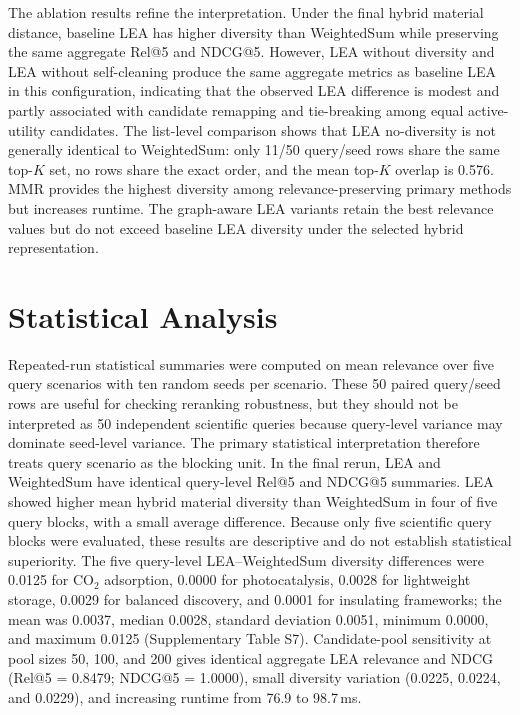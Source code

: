 \documentclass[12pt,a4paper]{article}
\begin{document}
The ablation results refine the interpretation. Under the final hybrid material distance, baseline LEA has higher diversity than WeightedSum while preserving the same aggregate Rel@5 and NDCG@5. However, LEA without diversity and LEA without self-cleaning produce the same aggregate metrics as baseline LEA in this configuration, indicating that the observed LEA difference is modest and partly associated with candidate remapping and tie-breaking among equal active-utility candidates. The list-level comparison shows that LEA no-diversity is not generally identical to WeightedSum: only 11/50 query/seed rows share the same top-$K$ set, no rows share the exact order, and the mean top-$K$ overlap is 0.576. MMR provides the highest diversity among relevance-preserving primary methods but increases runtime. The graph-aware LEA variants retain the best relevance values but do not exceed baseline LEA diversity under the selected hybrid representation.

\section{Statistical Analysis}
\label{sec:stats}

Repeated-run statistical summaries were computed on mean relevance over five query scenarios with ten random seeds per scenario. These 50 paired query/seed rows are useful for checking reranking robustness, but they should not be interpreted as 50 independent scientific queries because query-level variance may dominate seed-level variance. The primary statistical interpretation therefore treats query scenario as the blocking unit. In the final rerun, LEA and WeightedSum have identical query-level Rel@5 and NDCG@5 summaries. LEA showed higher mean hybrid material diversity than WeightedSum in four of five query blocks, with a small average difference. Because only five scientific query blocks were evaluated, these results are descriptive and do not establish statistical superiority. The five query-level LEA--WeightedSum diversity differences were 0.0125 for CO$_2$ adsorption, 0.0000 for photocatalysis, 0.0028 for lightweight storage, 0.0029 for balanced discovery, and 0.0001 for insulating frameworks; the mean was 0.0037, median 0.0028, standard deviation 0.0051, minimum 0.0000, and maximum 0.0125 (Supplementary Table S7). Candidate-pool sensitivity at pool sizes 50, 100, and 200 gives identical aggregate LEA relevance and NDCG (Rel@5 = 0.8479; NDCG@5 = 1.0000), small diversity variation (0.0225, 0.0224, and 0.0229), and increasing runtime from 76.9 to 98.7\,ms.
\end{document}
